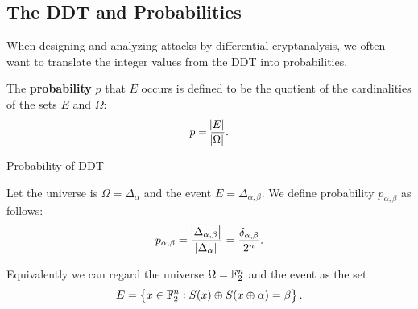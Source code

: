 \documentclass[11pt,openany]{article}
\begin{document}
\newpage
\subsection{The DDT and Probabilities}
When designing and analyzing attacks by differential cryptanalysis, we often want to translate the integer values from the DDT into probabilities.

\begin{note}
The \textbf{probability} $p$ that $E$ occurs is defined to be the quotient of the cardinalities of the sets $E$ and $\Omega$: \[
p=\frac{\abs{E}}{\abs{\Omega}}.
\]
\end{note}

\begin{defbox}{Probability of DDT}
\begin{definition}
	Let the universe is $\Omega=\Delta_\alpha$ and the event $E=\Delta_{\alpha,\beta}$. We define probability $p_{\alpha,\beta}$ as follows: \[
	p_{\alpha,\beta}=\frac{\abs{\Delta_{\alpha,\beta}}}{\abs{\Delta_\alpha}}=\frac{\delta_{\alpha,\beta}}{2^n}.
	\]
\end{definition}
\end{defbox}
\begin{remark}
	Equivalently we can regard the universe $\Omega=\mathbb{F}_2^n$ and the event as the set \[
	E=\set{x\in\mathbb{F}_2^n:S(x)\oplus S(x\oplus\alpha)=\beta}.
	\]
\end{remark}
\end{document}
